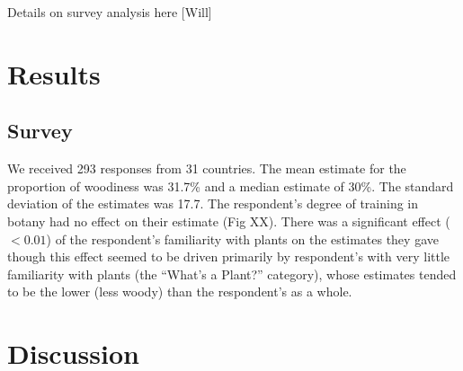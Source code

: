 \documentclass[12pt]{article}
\begin{document}
Details on survey analysis here [Will]


\section{Results}

\subsection{Survey}

We received 293 responses from 31 countries. The mean estimate for the proportion of woodiness was 31.7\% and a median estimate of 30\%. The standard deviation of the estimates was 17.7. The respondent's degree of training in botany had no effect on their estimate (Fig XX). There was a significant effect ($<0.01$) of the respondent's  familiarity with plants on the estimates they gave though this effect seemed to be driven primarily by respondent's with very little familiarity with plants (the ``What's a Plant?'' category), whose estimates tended to be the lower (less woody) than the respondent's as a whole.

\section{Discussion}



\end{document}
